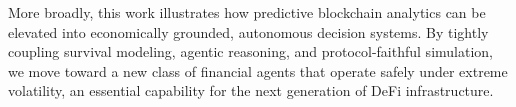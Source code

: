 \documentclass[manuscript,screen,review]{acmart}
\begin{document}

More broadly, this work illustrates how predictive blockchain analytics can be elevated into economically grounded, autonomous decision systems. By tightly coupling survival modeling, agentic reasoning, and protocol-faithful simulation, we move toward a new class of financial agents that operate safely under extreme volatility, an essential capability for the next generation of DeFi infrastructure.







\appendix
\end{document}
